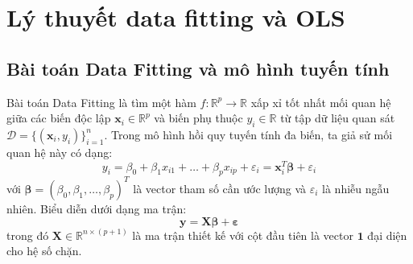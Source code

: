 \documentclass[12pt,a4paper]{article}
\begin{document}
\newpage
\pagestyle{fancy}
\setcounter{page}{1}
\renewcommand{\contentsname}{\centerline{MỤC LỤC}}
\tableofcontents
\newpage


\section{Lý thuyết data fitting và OLS}

\subsection{Bài toán Data Fitting và mô hình tuyến tính}
Bài toán Data Fitting là tìm một hàm $f : \mathbb{R}^p \to \mathbb{R}$ xấp xỉ tốt nhất mối quan hệ giữa các biến độc lập $\mathbf{x}_i \in \mathbb{R}^p$ và biến phụ thuộc $y_i \in \mathbb{R}$ từ tập dữ liệu quan sát $\mathcal{D} = \{(\mathbf{x}_i, y_i)\}_{i=1}^{n}$. Trong mô hình hồi quy tuyến tính đa biến, ta giả sử mối quan hệ này có dạng:
\begin{equation}
y_i = \beta_0 + \beta_1 x_{i1} + \dots + \beta_p x_{ip} + \varepsilon_i = \mathbf{x}_i^T \boldsymbol{\beta} + \varepsilon_i
\end{equation}
với $\boldsymbol{\beta} = (\beta_0, \beta_1, \dots, \beta_p)^T$ là vector tham số cần ước lượng và $\varepsilon_i$ là nhiễu ngẫu nhiên. Biểu diễn dưới dạng ma trận:
\begin{equation}
\mathbf{y} = \mathbf{X}\boldsymbol{\beta} + \boldsymbol{\varepsilon}
\end{equation}
trong đó $\mathbf{X} \in \mathbb{R}^{n \times (p+1)}$ là ma trận thiết kế với cột đầu tiên là vector $\mathbf{1}$ đại diện cho hệ số chặn.
\end{document}
